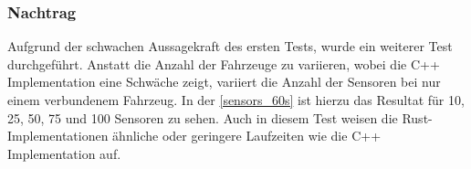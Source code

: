 \subsubsection{Nachtrag}

Aufgrund der schwachen Aussagekraft des ersten Tests, wurde ein weiterer Test durchgeführt. Anstatt die Anzahl der Fahrzeuge zu variieren, wobei die C++ Implementation eine Schwäche zeigt, variiert die Anzahl der Sensoren bei nur einem verbundenem Fahrzeug.
In der \autoref{sensors_60s} ist hierzu das Resultat für 10, 25, 50, 75 und 100 Sensoren zu sehen.
Auch in diesem Test weisen die Rust-Implementationen ähnliche oder geringere Laufzeiten wie die C++ Implementation auf.



